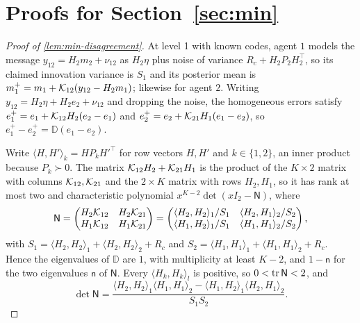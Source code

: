 \section{Proofs for \texorpdfstring{Section~\ref{sec:min}}{the minimal model}}\label{app:min}

\begin{proof}[Proof of \cref{lem:min-disagreement}]
At level 1 with known codes, agent $1$ models the message $y_{12}=H_2m_2+\nu_{12}$ as $H_2\eta$ plus noise of variance $R_c+H_2P_2H_2^\top$, so its claimed innovation variance is $S_1$ and its posterior mean is $m^+_1=m_1+\mathcal{K}_{12}(y_{12}-H_2m_1)$; likewise for agent $2$. Writing $y_{12}=H_2\eta+H_2e_2+\nu_{12}$ and dropping the noise, the homogeneous errors satisfy $e^+_1=e_1+\mathcal{K}_{12}H_2(e_2-e_1)$ and $e^+_2=e_2+\mathcal{K}_{21}H_1(e_1-e_2)$, so $e^+_1-e^+_2=\mathbb D(e_1-e_2)$.

Write $\langle H,H'\rangle_k=HP_kH'^\top$ for row vectors $H,H'$ and $k\in\{1,2\}$, an inner product because $P_k\succ0$. The matrix $\mathcal{K}_{12}H_2+\mathcal{K}_{21}H_1$ is the product of the $K\times2$ matrix with columns $\mathcal{K}_{12},\mathcal{K}_{21}$ and the $2\times K$ matrix with rows $H_2,H_1$, so it has rank at most two and characteristic polynomial $x^{K-2}\det(xI_2-\mathsf N)$, where
\[
\mathsf N=\begin{pmatrix}H_2\mathcal{K}_{12}&H_2\mathcal{K}_{21}\\H_1\mathcal{K}_{12}&H_1\mathcal{K}_{21}\end{pmatrix}=\begin{pmatrix}\langle H_2,H_2\rangle_1/S_1&\langle H_2,H_1\rangle_2/S_2\\\langle H_1,H_2\rangle_1/S_1&\langle H_1,H_1\rangle_2/S_2\end{pmatrix},
\]
with $S_1=\langle H_2,H_2\rangle_1+\langle H_2,H_2\rangle_2+R_c$ and $S_2=\langle H_1,H_1\rangle_1+\langle H_1,H_1\rangle_2+R_c$. Hence the eigenvalues of $\mathbb D$ are $1$, with multiplicity at least $K-2$, and $1-\mathsf n$ for the two eigenvalues $\mathsf n$ of $\mathsf N$. Every $\langle H_k,H_k\rangle_l$ is positive, so $0<\operatorname{tr}\mathsf N<2$, and
\[
\det\mathsf N=\frac{\langle H_2,H_2\rangle_1\langle H_1,H_1\rangle_2-\langle H_1,H_2\rangle_1\langle H_2,H_1\rangle_2}{S_1S_2}.
\]


\end{proof}
